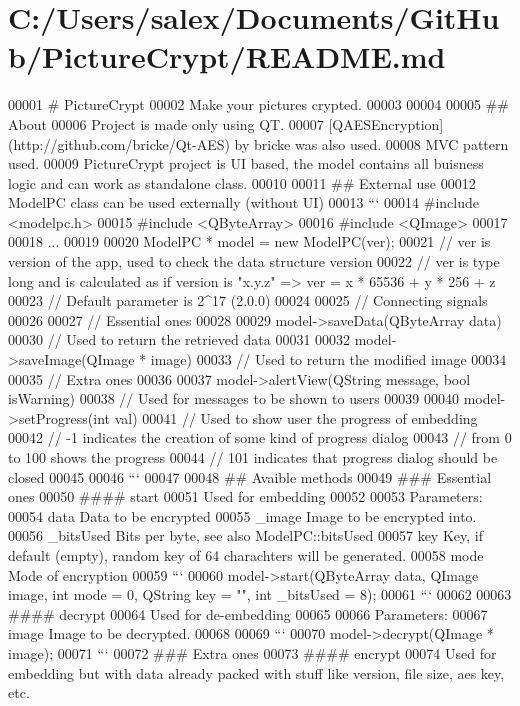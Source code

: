 \hypertarget{_r_e_a_d_m_e_8md_source}{}\section{C\+:/\+Users/salex/\+Documents/\+Git\+Hub/\+Picture\+Crypt/\+R\+E\+A\+D\+ME.md}

\begin{DoxyCode}
00001 # PictureCrypt
00002 Make your pictures crypted.
00003 
00004 
00005 ## About
00006 Project is made only using QT.
00007 [QAESEncryption](http://github.com/bricke/Qt-AES) by bricke was also used.
00008 MVC pattern used.
00009 PictureCrypt project is UI based, the model contains all buisness logic and can work as standalone
       class.
00010 
00011 ## External use
00012 ModelPC class can be used externally (without UI)
00013 ```
00014 #include <modelpc.h>
00015 #include <QByteArray>
00016 #include <QImage>
00017 
00018 ...
00019 
00020 ModelPC * model = new ModelPC(ver);
00021 // ver is version of the app, used to check the data structure version
00022 // ver is type long and is calculated as if version is "x.y.z" => ver = x * 65536 + y * 256 + z
00023 // Default parameter is 2^17 (2.0.0)
00024 
00025 // Connecting signals
00026 
00027 // Essential ones
00028 
00029 model->saveData(QByteArray data)
00030 // Used to return the retrieved data
00031 
00032 model->saveImage(QImage * image)
00033 // Used to return the modified image
00034 
00035 // Extra ones
00036 
00037 model->alertView(QString message, bool isWarning)
00038 // Used for messages to be shown to users
00039 
00040 model->setProgress(int val)
00041 // Used to show user the progress of embedding
00042 // -1 indicates the creation of some kind of progress dialog
00043 // from 0 to 100 shows the progress
00044 // 101 indicates that progress dialog should be closed
00045 
00046 ```
00047 
00048 ## Avaible methods
00049 ### Essential ones
00050 #### start
00051 Used for embedding
00052 
00053 Parameters:
00054 data   Data to be encrypted
00055 \_image Image to be encrypted into.
00056 \_bitsUsed  Bits per byte, see also ModelPC::bitsUsed
00057 key    Key, if default (empty), random key of 64 charachters will be generated.
00058 mode   Mode of encryption
00059 ```
00060 model->start(QByteArray data, QImage image, int mode = 0, QString key = "", int \_bitsUsed = 8);
00061 ```
00062 
00063 #### decrypt
00064 Used for de-embedding
00065 
00066 Parameters:
00067 image  Image to be decrypted.
00068 
00069 ```
00070 model->decrypt(QImage * image);
00071 ```
00072 ### Extra ones
00073 #### encrypt
00074 Used for embedding but with data already packed with stuff like version, file size, aes key, etc.

\end{DoxyCode}
